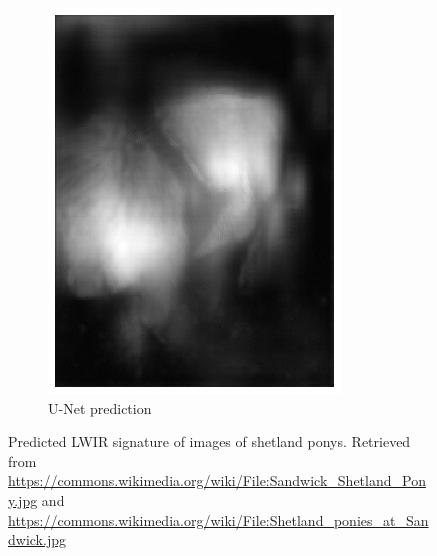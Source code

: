 \documentclass{l4proj}
\begin{document}
\begin{figure}[ht]
\begin{subfigure}[h!]{0.25\textwidth}
    \includegraphics[width=\textwidth]{images/unet/pony_2_predicted.png}
    \caption{U-Net prediction}
  \end{subfigure}
  \caption{Predicted LWIR signature of images of shetland ponys. Retrieved from \url{https://commons.wikimedia.org/wiki/File:Sandwick_Shetland_Pony.jpg} and \url{https://commons.wikimedia.org/wiki/File:Shetland_ponies_at_Sandwick.jpg}}
  \label{fig:autoencoder_pony}
\end{figure}




\end{document}

